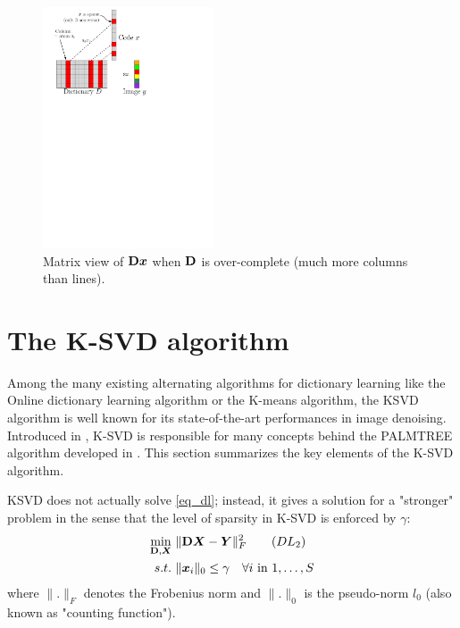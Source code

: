 \begin{figure}[!ht] \centering
\includegraphics[width=0.45\textwidth]{figures/sparsity-matrix.pdf}
\caption{Matrix view of $\mathbf{D}\bm{x}$ when $\mathbf{D}$ is over-complete (much more columns than lines).}\label{fig_overcomplete_matrix}
\end{figure}



\section{The K-SVD algorithm}

Among the many existing alternating algorithms for dictionary learning like the Online dictionary learning algorithm or the K-means algorithm, the \ac{KSVD} algorithm is well known for its state-of-the-art performances in image denoising. Introduced in \cite{aharon_k-svd:_2006}, K-SVD is responsible for many concepts behind the PALMTREE algorithm developed in \cite{chabiron_optimization_2016}. This section summarizes the key elements of the K-SVD algorithm.

\ac{KSVD} does not actually solve \eqref{eq_dl}; instead, it gives a solution for a "stronger" problem in the sense that the level of sparsity in K-SVD is enforced by $\gamma$:
\begin{align*}
\underset{\mathbf{D},\bm{X}}{\min}~ & \lVert \mathbf{D}\bm{X}-\bm{Y} \rVert^2_F \tag{$DL_2$}\label{eq_dl_ksvd} \\
s.t.~& \lVert \bm{x}_i \rVert_0 \le \gamma \quad \forall i \text{ in } 1,\dots,S
\end{align*}
where $\lVert . \rVert_F$ denotes the Frobenius norm and $\lVert . \rVert_0$ is the pseudo-norm $l_0$ (also known as "counting function").

